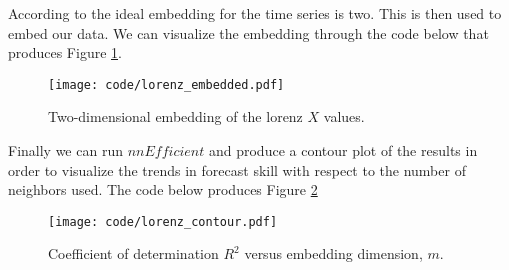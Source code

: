 According to the ideal embedding for the time series is two. This is then used to embed our data. We can visualize the embedding through the code below that produces Figure \ref{code_embedding}.




\begin{figure}[htbp] %
   \centering
   \texttt{[image: code/lorenz\_embedded.pdf]} 
   \caption{Two-dimensional embedding of the lorenz $X$ values.}
   \label{code_embedding}
\end{figure}



Finally we can run $nnEfficient$ and produce a contour plot of the results in order to visualize the trends in forecast skill with respect to the number of neighbors used. The code below produces Figure \ref{code_contour}




\begin{figure}[htbp] %
   \centering
   \texttt{[image: code/lorenz\_contour.pdf]} 
   \caption{Coefficient of determination $R^2$ versus embedding dimension, $m$.}
   \label{code_contour}
\end{figure}












